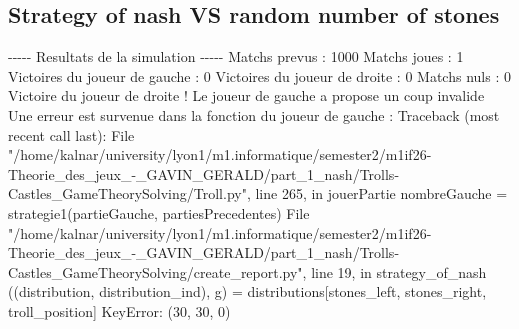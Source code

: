 \documentclass{article}%
\begin{document}
\subsection{Strategy of nash VS random number of stones}%
\label{subsec:Strategy of nash VS random number of stones}%
{-}{-}{-}{-}{-} Resultats de la simulation {-}{-}{-}{-}{-}\newline%
		\newline%
Matchs prevus : 1000\newline%
Matchs joues : 1\newline%
\newline%
Victoires du joueur de gauche : 0\newline%
Victoires du joueur de droite : 0\newline%
Matchs nuls : 0\newline%
\newline%
Victoire du joueur de droite ! Le joueur de gauche a propose un coup invalide\newline%
Une erreur est survenue dans la fonction du joueur de gauche : \newline%
Traceback (most recent call last):\newline%
  File "/home/kalnar/university/lyon1/m1.informatique/semester2/m1if26{-}Theorie\_des\_jeux\_{-}\_GAVIN\_GERALD/part\_1\_nash/Trolls{-}Castles\_GameTheorySolving/Troll.py", line 265, in jouerPartie\newline%
    nombreGauche = strategie1(partieGauche, partiesPrecedentes)\newline%
  File "/home/kalnar/university/lyon1/m1.informatique/semester2/m1if26{-}Theorie\_des\_jeux\_{-}\_GAVIN\_GERALD/part\_1\_nash/Trolls{-}Castles\_GameTheorySolving/create\_report.py", line 19, in strategy\_of\_nash\newline%
    ((distribution, distribution\_ind), g) = distributions{[}stones\_left, stones\_right, troll\_position{]}\newline%
KeyError: (30, 30, 0)\newline%

%
\end{document}
